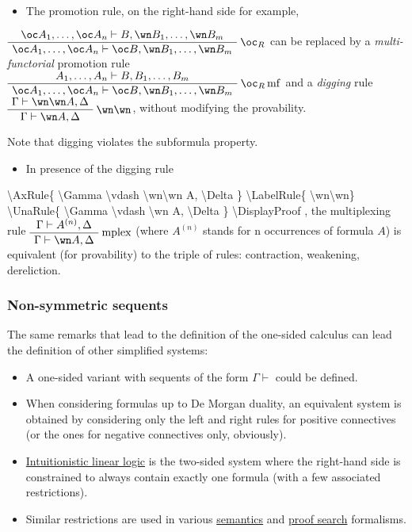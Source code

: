 \begin{itemize}
\tightlist
\item
  The promotion rule, on the right-hand side for example,
\end{itemize}

\(\AxRule{ \oc A_1, \ldots, \oc A_n \vdash B, \wn B_1, \ldots, \wn B_m }
\LabelRule{ \oc_R }
\UnaRule{ \oc A_1, \ldots, \oc A_n \vdash \oc B, \wn B_1, \ldots, \wn B_m }
\DisplayProof\) can be replaced by a \emph{multi-functorial} promotion
rule \(\AxRule{ A_1, \ldots, A_n \vdash B, B_1, \ldots, B_m }
\LabelRule{ \oc_R \rulename{mf}}
\UnaRule{ \oc A_1, \ldots, \oc A_n \vdash \oc B, \wn B_1, \ldots, \wn B_m }
\DisplayProof\) and a \emph{digging} rule
\(\AxRule{ \Gamma \vdash \wn\wn A, \Delta }
\LabelRule{ \wn\wn}
\UnaRule{ \Gamma \vdash \wn A, \Delta }
\DisplayProof\), without modifying the provability.

Note that digging violates the subformula property.

\begin{itemize}
\tightlist
\item
  In presence of the digging rule 
\end{itemize}

\textbackslash{}AxRule\{ \textbackslash{}Gamma \textbackslash{}vdash
\textbackslash{}wn\textbackslash{}wn A, \textbackslash{}Delta \}
\textbackslash{}LabelRule\{ \textbackslash{}wn\textbackslash{}wn\}
\textbackslash{}UnaRule\{ \textbackslash{}Gamma \textbackslash{}vdash
\textbackslash{}wn A, \textbackslash{}Delta \}
\textbackslash{}DisplayProof , the multiplexing rule
\(\AxRule{\Gamma\vdash A^{(n)},\Delta}
\LabelRule{\rulename{mplex}}
\UnaRule{\Gamma\vdash \wn A,\Delta}
\DisplayProof\) (where \(A^{(n)}\) stands for n occurrences of formula
\(A\)) is equivalent (for provability) to the triple of rules:
contraction, weakening, dereliction.

\subsubsection{Non-symmetric sequents}\label{non-symmetric-sequents}

The same remarks that lead to the definition of the one-sided calculus
can lead the definition of other simplified systems:

\begin{itemize}
\tightlist
\item
  A one-sided variant with sequents of the form \(\Gamma\vdash\) could
  be defined.
\item
  When considering formulas up to De Morgan duality, an equivalent
  system is obtained by considering only the left and right rules for
  positive connectives (or the ones for negative connectives only,
  obviously).
\item
  \href{Intuitionistic_linear_logic}{Intuitionistic linear logic} is the
  two-sided system where the right-hand side is constrained to always
  contain exactly one formula (with a few associated restrictions).
\item
  Similar restrictions are used in various \url{semantics} and
  \href{proof_search}{proof search} formalisms.
\end{itemize}

